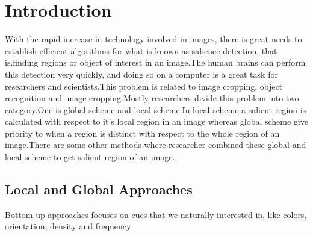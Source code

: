 \section{Introduction}

With the rapid increase in technology involved in images, there is great needs to establish efficient  algorithms for what is known as salience detection, that is,finding regions or object of interest in an image.The human brains can perform this detection very quickly, and doing so on a computer is a great task for researchers and scientists.This problem is related to image cropping, object recognition and image cropping.Mostly researchers divide this problem into two category.One is global scheme and local scheme.In local scheme a salient region is calculated with respect to it's local region in an image whereas global scheme give priority to when a region is distinct with respect to the whole region of an image.There are some other methods where researcher combined these global and local scheme to get salient region of an image.

\subsection{Local and Global Approaches}
Bottom-up approaches focuses on cues that we naturally interested in, like colors, orientation, density and frequency  

